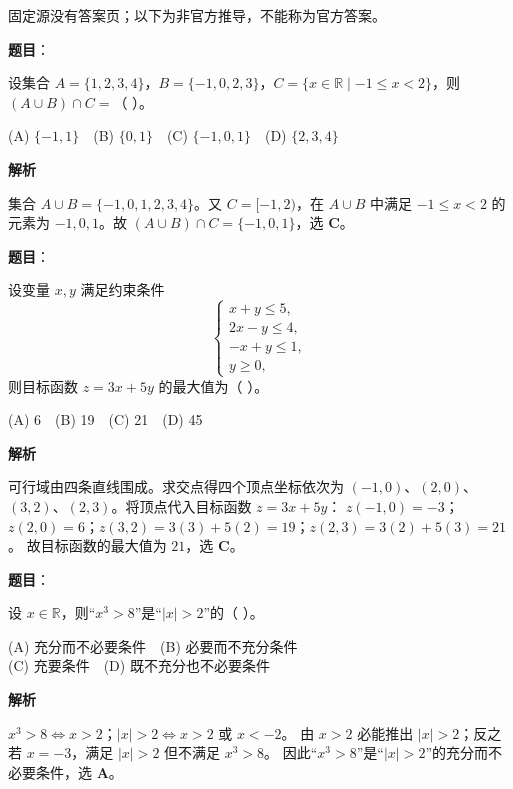 
\begin{gktip}
固定源没有答案页；以下为非官方推导，不能称为官方答案。
\end{gktip}


\begin{answer}

\textbf{题目}：

设集合 $A=\{1,2,3,4\}$，$B=\{-1,0,2,3\}$，$C=\{x\in\mathbb R\mid -1\leqslant x<2\}$，则 $(A\cup B)\cap C=$（ ）。

(A) $\{-1,1\}$　(B) $\{0,1\}$　(C) $\{-1,0,1\}$　(D) $\{2,3,4\}$

\textbf{解析}

集合 $A\cup B=\{-1,0,1,2,3,4\}$。又 $C=[-1,2)$，在 $A\cup B$ 中满足 $-1\leqslant x<2$ 的元素为 $-1,0,1$。故 $(A\cup B)\cap C=\{-1,0,1\}$，选 \textbf{C}。


\end{answer}
\begin{answer}

\textbf{题目}：

设变量 $x,y$ 满足约束条件
\nopagebreak[4]
\[
\begin{cases}
x+y\leqslant5,\\
2x-y\leqslant4,\\
-x+y\leqslant1,\\
y\geqslant0,
\end{cases}
\]
则目标函数 $z=3x+5y$ 的最大值为（ ）。

(A) 6　(B) 19　(C) 21　(D) 45

\textbf{解析}

可行域由四条直线围成。求交点得四个顶点坐标依次为 $(-1,0)$、$(2,0)$、$(3,2)$、$(2,3)$。将顶点代入目标函数 $z=3x+5y$：
$z(-1,0)=-3$；$z(2,0)=6$；$z(3,2)=3(3)+5(2)=19$；$z(2,3)=3(2)+5(3)=21$。
故目标函数的最大值为 $21$，选 \textbf{C}。


\end{answer}
\begin{answer}

\textbf{题目}：

设 $x\in\mathbb R$，则“$x^3>8$”是“$|x|>2$”的（ ）。

(A) 充分而不必要条件　(B) 必要而不充分条件\\
(C) 充要条件　(D) 既不充分也不必要条件

\textbf{解析}

$x^3>8\iff x>2$；$|x|>2\iff x>2$ 或 $x<-2$。
由 $x>2$ 必能推出 $|x|>2$；反之若 $x=-3$，满足 $|x|>2$ 但不满足 $x^3>8$。
因此“$x^3>8$”是“$|x|>2$”的充分而不必要条件，选 \textbf{A}。


\end{answer}
